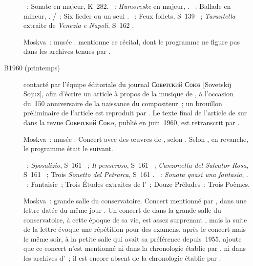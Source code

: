 \begin{description}
 \textsc{\Mozart{}}~: Sonate  en \kE \Flat majeur, K~282.
 \textsc{\Schumann{}}~: \emph{Humoreske} en \kB \Flat majeur, .
 \textsc{\Chopin{}}~: Ballade  en \kG mineur, .
 \textsc{\Schubert{}/\Liszt{}}~: Six lieder \citep[selon][]{TADGO1960} ou un
 seul \citep[selon][]{Nekrasova08}.
 \textsc{\Liszt{}}~: Feux follets, S~139 ~; \emph{Tarantella}
 extraite de \emph{Venezia e Napoli}, S~162 .
 \item[\DateWithWeekDay{1960-03-14}]
 Moskva~: musée \Scriabine{}.
 \citet[p.~184]{Nekrasova08} mentionne ce récital, dont le programme ne
 figure pas dans les archives tenues par \AVizel{}.
 \item[B1960 (printemps)]
 \VSofronitsky{} contacté par l'équipe éditoriale du journal
 \foreignlanguage{russian}{Советский Союз} [Sovetskij Sojuz], afin d'écrire
 un article à propos de la musique de \RSchumann{}, à l'occasion
 du~150\ieme{} anniversaire de la naissance du compositeur~; un brouillon
 préliminaire de l'article est reproduit par \citet[p.~386-387]{Shiryaeva}.
 Le texte final de l'article de \Sofronitsky{} sur \Schumann{} dans la revue
 \foreignlanguage{russian}{Советский Союз}, publié en juin~1960, est
 retranscrit par \citet[p.~447-448]{Milshteyn82a}.
 \item[\DateWithWeekDay{1960-04-07}]
 Moskva~: musée \Scriabine{}.
 Concert avec des œuvres de \Scriabine{}, selon \citet[p.~443]{Scriabine}.
 Selon \citet[p.~184]{Nekrasova08}, en revanche, le programme était le
 suivant.

 \textsc{\Liszt{}}~: \emph{Sposalizio}, S~161 ~; \emph{Il
 penseroso}, S~161 ~; \emph{Canzonetta del Salvator Rosa}, S~161
 ~; Trois \emph{Sonetto del Petrarca}, S~161 .
 \textsc{\Beethoven{}}~: \emph{Sonata quasi una fantasia}, 
 .
 \textsc{\Scriabine{}}~: Fantaisie~; Trois Études extraites de l'~;
 Douze Préludes~; Trois Poèmes.
 \item[\DateWithWeekDay{1960-04-18}]\label{bio:LateMCGH}
 Moskva~: grande salle du conservatoire.
 Concert mentionné par \VSofronitsky{}, dans une lettre datée du même jour
 \citep[voir][p.~184]{Nekrasova08}.
 Un concert de \Sofronitsky{} dans la grande salle du conservatoire, à cette
 époque de sa vie, est assez surprenant \citep[p.~59]{Juban}, mais la suite
 de la lettre évoque une répétition pour des examens, après le concert mais
 le même soir, à la petite salle qui avait sa préférence depuis~1955.
 \citet[p.~184]{Nekrasova08} ajoute que ce concert n'est mentionné ni dans
 la chronologie établie par \citet[p.~455-461]{Milshteyn82a}, ni dans les
 archives d'\AVizel{}~; il est encore absent de la chronologie établie par
 \citet[p.~443]{Scriabine}.


\end{description}
